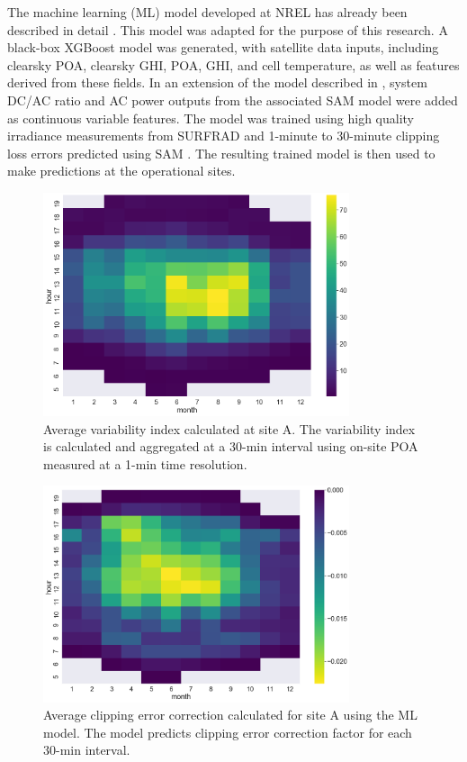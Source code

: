\documentclass[conference]{IEEEtran}
\begin{document}
The machine learning (ML) model developed at NREL has already been described in detail \cite{Anderson2020}. This model was adapted for the purpose of this research. A black-box XGBoost model was generated, with satellite data inputs, including clearsky POA, clearsky GHI, POA, GHI, and cell temperature, as well as features derived from these fields. In an extension of the model described in \cite{Anderson2020}, system DC/AC ratio and AC power outputs from the associated SAM model were added as continuous variable features. The model was trained using high quality irradiance measurements from SURFRAD \cite{Augustine2000} and 1-minute to 30-minute clipping loss errors predicted using SAM \cite{Freeman2018}. The resulting trained model is then used to make predictions at the operational sites.

\begin{figure}[htbp]
\centerline{\includegraphics[width=9cm]{DCS_VI_heatmap.png}}
\caption{Average variability index calculated at site A. The variability index is calculated and aggregated at a 30-min interval using on-site POA measured at a 1-min time resolution.}
\label{fig:DCS-VI}
\end{figure}

\begin{figure}[htbp]
\centerline{\includegraphics[width=9cm]{DCS_CLEC_heatmap.png}}
\caption{Average clipping error correction calculated for site A using the ML model. The model predicts clipping error correction factor for each 30-min interval.}
\label{fig:irradiance-and-power}
\end{figure}
\end{document}
